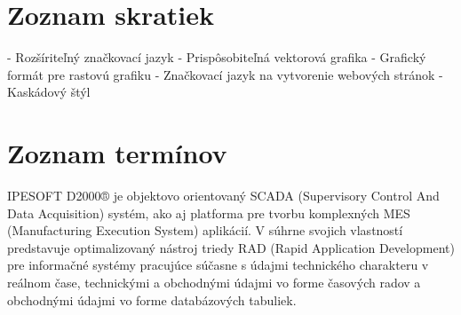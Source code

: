 \chapter*{Zoznam skratiek}
\begin{acronym}
	 - Rozšíriteľný značkovací jazyk
	 - Prispôsobiteľná vektorová grafika
	 - Grafický formát pre rastovú grafiku  
 - Značkovací jazyk na vytvorenie webových stránok 
 - Kaskádový štýl
\end{acronym}



\chapter*{Zoznam termínov}

IPESOFT D2000® je objektovo orientovaný SCADA (Supervisory Control And Data Acquisition) systém, ako aj platforma pre tvorbu komplexných MES (Manufacturing Execution System) aplikácií. V súhrne svojich vlastností predstavuje optimalizovaný nástroj triedy RAD (Rapid Application Development) pre informačné systémy pracujúce súčasne s údajmi technického charakteru v reálnom čase, technickými a obchodnými údajmi vo forme časových radov a obchodnými údajmi vo forme databázových tabuliek.




